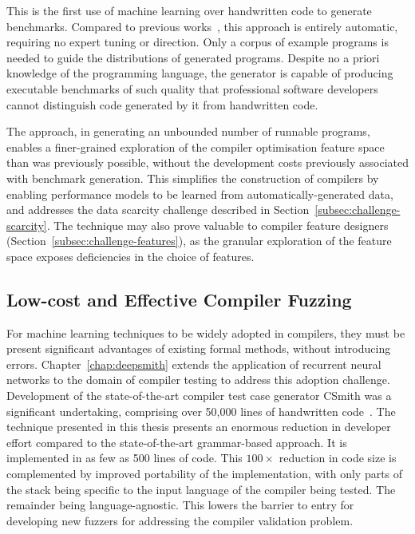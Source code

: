This is the first use of machine learning over handwritten code to generate benchmarks. Compared to previous works~\cite{Chiu2015}, this approach is entirely automatic, requiring no expert tuning or direction. Only a corpus of example programs is needed to guide the distributions of generated programs. Despite no a priori knowledge of the programming language, the generator is capable of producing executable benchmarks of such quality that professional software developers cannot distinguish code generated by it from handwritten code.

The approach, in generating an unbounded number of runnable programs, enables a finer-grained exploration of the compiler optimisation feature space than was previously possible, without the development costs previously associated with benchmark generation. This simplifies the construction of compilers by enabling performance models to be learned from automatically-generated data, and addresses the data scarcity challenge described in Section~\ref{subsec:challenge-scarcity}. The technique may also prove valuable to compiler feature designers (Section~\ref{subsec:challenge-features}), as the granular exploration of the feature space exposes deficiencies in the choice of features.


\subsection{Low-cost and Effective Compiler Fuzzing}

For machine learning techniques to be widely adopted in compilers, they must be present significant advantages of existing formal methods, without introducing errors. Chapter~\ref{chap:deepsmith} extends the application of recurrent neural networks to the domain of compiler testing to address this adoption challenge. Development of the state-of-the-art compiler test case generator CSmith was a significant undertaking, comprising over 50,000 lines of handwritten code~\cite{Yang2011,Lidbury2015a}. The technique presented in this thesis presents an enormous reduction in developer effort compared to the state-of-the-art grammar-based approach. It is implemented in as few as 500 lines of code. This $100\times$ reduction in code size is complemented by improved portability of the implementation, with only parts of the stack being specific to the input language of the compiler being tested. The remainder being language-agnostic. This lowers the barrier to entry for developing new fuzzers for addressing the compiler validation problem.

